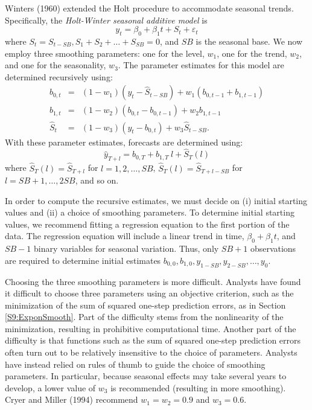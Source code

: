 Winters (1960) extended the Holt procedure to accommodate seasonal
trends. Specifically, the \emph{Holt-Winter seasonal additive model}
is
\begin{equation*}
y_t = \beta_0 + \beta_1 t + S_t + \varepsilon_t
\end{equation*}
where $S_t=S_{t-SB},S_1+S_2+\ldots+S_{SB}=0$, and $SB$ is the
seasonal base. We now employ three smoothing parameters: one for the
level, $w_1$, one for the trend, $w_2$, and one for the seasonality,
$w_{3}$. The parameter estimates for this model are determined
recursively using:
\begin{eqnarray*}
b_{0,t} &=&(1-w_1)\left( y_t-\widehat{S}_{t-SB}\right)
+w_1(b_{0,t-1}+b_{1,t-1}) \\
b_{1,t} &=&(1-w_2)(b_{0,t}-b_{0,t-1})+w_2b_{1,t-1} \\
\widehat{S}_t &=&(1-w_{3})\left( y_t-b_{0,t}\right)
+w_{3}\widehat{S} _{t-SB}.
\end{eqnarray*}
With these parameter estimates, forecasts are determined using:
\begin{equation*}
\widehat{y}_{T+l}=b_{0,T}+b_{1,T}~l+\widehat{S}_T(l)
\end{equation*}
where $\widehat{S}_T(l)=\widehat{S}_{T+l}$ for $l=1,2,\ldots,SB$,
$\widehat{S} _T(l)=\widehat{S}_{T+l-SB}$ for $l=SB+1,\ldots,2SB$,
and so on.

In order to compute the recursive estimates, we must decide on (i)
initial starting values and (ii) a choice of smoothing parameters.
To determine initial starting values, we recommend fitting a
regression equation to the first portion of the data. The regression
equation will include a linear trend in time, $\beta_0 + \beta_1 t$,
and $SB-1$ binary variables for seasonal variation. Thus, only
$SB+1$ observations are required to determine initial estimates
$b_{0,0}, b_{1,0}, y_{1-SB}, y_{2-SB},\ldots, y_0$.

Choosing the three smoothing parameters is more difficult. Analysts
have found it difficult to choose three parameters using an
objective criterion, such as the minimization of the sum of squared
one-step prediction errors, as in Section \ref{S9:ExponSmooth}. Part
of the difficulty stems from the nonlinearity of the minimization,
resulting in prohibitive computational time. Another part of the
difficulty is that functions such as the sum of squared one-step
prediction errors often turn out to be relatively insensitive to the
choice of parameters. Analysts have instead relied on rules of thumb
to guide the choice of smoothing parameters. In particular, because
seasonal effects may take several years to develop, a lower value of
$w_{3}$ is recommended (resulting in more smoothing). Cryer and
Miller (1994) recommend $w_1=w_2=0.9$ and $w_{3}=0.6$.

